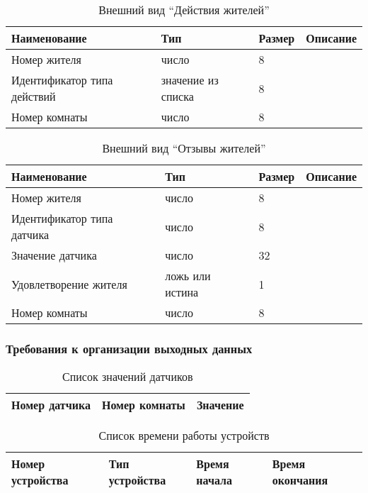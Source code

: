           \begin{table}[h!]
            \centering
            \caption{Внешний вид “Действия жителей”}
            \label{room:size}
            \begin{tabular}{|l|l|l|l|}
            \hline
            Наименование & Тип & Размер & Описание \\ \hline
            Номер жителя & число & 8 & \\ \hline
            Идентификатор типа действий & значение из списка & 8 & \\ \hline
            Номер комнаты & число & 8 & \\ \hline
            \end{tabular}
          \end{table}
          \begin{table}[h!]
            \centering
            \caption{Внешний вид “Отзывы жителей”}
            \label{room:size}
            \begin{tabular}{|l|l|l|l|}
            \hline
            Наименование & Тип & Размер & Описание \\ \hline
            Номер жителя & число & 8 & \\ \hline
            Идентификатор типа датчика & число & 8 & \\ \hline
            Значение датчика & число & 32 & \\ \hline
            Удовлетворение жителя & ложь или истина & 1 & \\ \hline
            Номер комнаты & число & 8 & \\ \hline
            \end{tabular}
          \end{table} 
    \subsubsection{Требования к организации выходных данных}
      \begin{table}[H]
      \centering
      \caption{Список значений датчиков}
      \label{sensor:statistic}
      \begin{tabular}{|l|l|l|}
      \hline
      Номер датчика & Номер комнаты & Значение \\ \hline
      \end{tabular}
      \end{table}
      
      \begin{table}[H]
      \centering
      \caption{Список времени работы устройств}
      \label{device:statistic}
      \begin{tabular}{|l|l|l|l|}
      \hline
      Номер устройства & Тип устройства & Время начала & Время окончания \\ \hline
      \end{tabular}
      \end{table}
